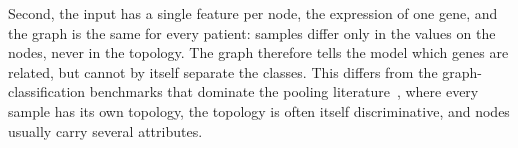 Second, the input has a single feature per node, the expression of one gene, and the graph is the
same for every patient: samples differ only in the values on the nodes, never in the topology.
The graph therefore tells the model which genes are related, but cannot by itself separate the
classes. This differs from the graph-classification benchmarks that dominate the pooling
literature~\cite{morris2020tudataset}, where every sample has its own topology, the topology is
often itself discriminative, and nodes usually carry several attributes.
